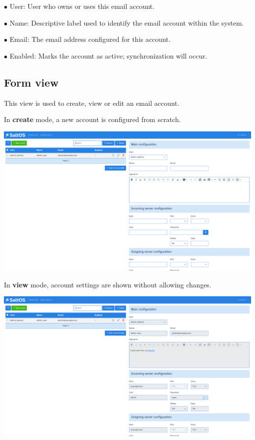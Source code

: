 \documentclass[a4paper]{article}
\begin{document}
\begin{compactitem}
\item[\color{myblue}$\bullet$] User: User who owns or uses this email account.
\item[\color{myblue}$\bullet$] Name: Descriptive label used to identify the email account within the system.
\item[\color{myblue}$\bullet$] Email: The email address configured for this account.
\item[\color{myblue}$\bullet$] Enabled: Marks the account as active; synchronization will occur.
\end{compactitem}

\hypertarget{toc99}{}
\subsection{Form view}

This view is used to create, view or edit an email account.

In \textbf{create} mode, a new account is configured from scratch.

\begin{center}\includegraphics[width=1\textwidth]{../ujest/snaps/test-screenshots-js-screenshots-emails-emails-accounts-create-en-us-1-snap.png}\end{center}

In \textbf{view} mode, account settings are shown without allowing changes.

\begin{center}\includegraphics[width=1\textwidth]{../ujest/snaps/test-screenshots-js-screenshots-emails-emails-accounts-view-1-en-us-1-snap.png}\end{center}
\end{document}
